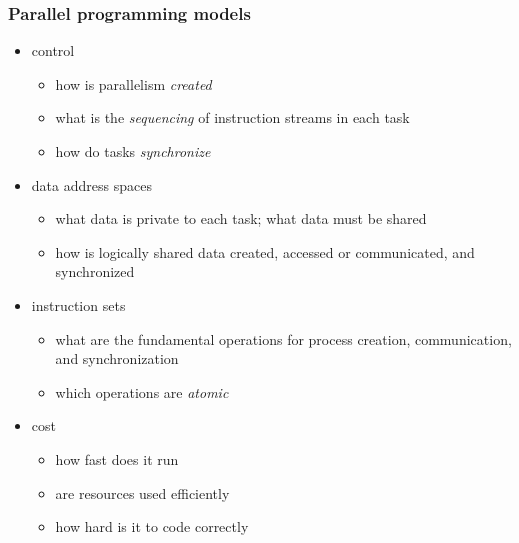 \begin{frame}[fragile]
%
  \frametitle{Parallel programming models}
%
  \begin{itemize}
%
  \item control
    \begin{itemize}
    \item how is parallelism {\em created}
    \item what is the {\em sequencing} of instruction streams in each task
    \item how do tasks {\em synchronize}
    \end{itemize}
%
    \item data address spaces
      \begin{itemize}
        \item what data is private to each task; what data must be shared
        \item how is logically shared data created, accessed or communicated, and synchronized
      \end{itemize}
%
    \item instruction sets
      \begin{itemize}
      \item what are the fundamental operations for process creation, communication,
        and synchronization
      \item which operations are {\em atomic}
      \end{itemize}
%
    \item cost
      \begin{itemize}
      \item how fast does it run
      \item are resources used efficiently
      \item how hard is it to code correctly
      \end{itemize}
%
  \end{itemize}
%
\end{frame}

